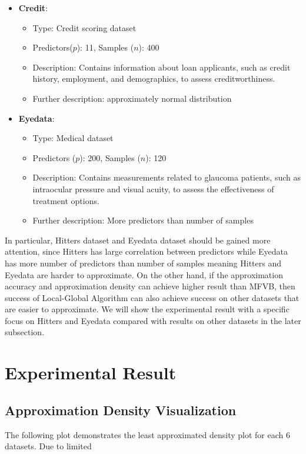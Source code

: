 \begin{itemize}
	\item \textbf{Credit}:
	\begin{itemize}
		\item Type: Credit scoring dataset
		\item Predictors($p$): 11, Samples ($n$): 400
		\item Description: Contains information about loan applicants, such as credit history, employment, and demographics, to assess creditworthiness.
		\item Further description: approximately normal distribution
	\end{itemize}
	
	\item \textbf{Eyedata}:
	\begin{itemize}
		\item Type: Medical dataset
		\item Predictors ($p$): 200, Samples ($n$): 120
		\item Description: Contains measurements related to glaucoma patients, such as intraocular pressure and visual acuity, to assess the effectiveness of treatment options.
		\item Further description: More predictors than number of samples
	\end{itemize}
\end{itemize}

In particular, Hitters dataset and Eyedata dataset should be gained more attention, since Hitters has large correlation between predictors while Eyedata has more number of predictors than number of samples meaning Hitters and Eyedata are harder to approximate. On the other hand, if the approximation accuracy and approximation density can achieve higher result than MFVB, then success of Local-Global Algorithm can also achieve success on other datasets that are easier to approximate. We will show the experimental result with a specific focus on Hitters and Eyedata compared with results on other datasets in the later subsection.

\newpage
\section{Experimental Result}

\subsection{Approximation Density Visualization}
The following plot demonstrates the least approximated density plot for each 6 datasets. Due to limited



